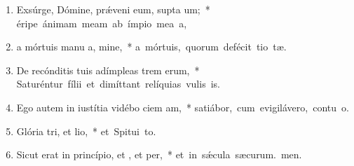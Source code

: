 \begin{flushleft}
\begin{enumerate}[leftmargin=*]
\item Exsúrge, Dómine, pr\'{\ae}veni eum, supta um;~* \mbox{éripe ánimam meam ab ímpio mea a,}

\item a mórtuis manu a, mine,~* \mbox{a mórtuis, quorum defécit tio tæ.}

\item De recónditis tuis adímpleas trem erum,~* \mbox{Saturéntur fílii et dimíttant relíquias vulis is.}

\item Ego autem in iustítia vidébo ciem am,~* \mbox{satiábor, cum evigilávero, contu o.}

\item Glória tri, et lio,~* \mbox{et Spitui to.}

\item Sicut erat in princípio, et , et per,~* \mbox{et in s\'{\ae}cula sæcurum. men.}


\end{enumerate}
\end{flushleft}

